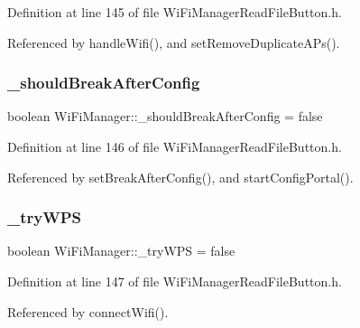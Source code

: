Definition at line 145 of file Wi\+Fi\+Manager\+Read\+File\+Button.\+h.



Referenced by handle\+Wifi(), and set\+Remove\+Duplicate\+A\+Ps().

\mbox{\label{class_wi_fi_manager_adf42bd3bb7ac538e97407f66e5170858}} 
\subsubsection{\texorpdfstring{\+\_\+should\+Break\+After\+Config}{\_shouldBreakAfterConfig}}
{\footnotesize\ttfamily boolean Wi\+Fi\+Manager\+::\+\_\+should\+Break\+After\+Config = false\hspace{0.3cm}{\ttfamily [private]}}



Definition at line 146 of file Wi\+Fi\+Manager\+Read\+File\+Button.\+h.



Referenced by set\+Break\+After\+Config(), and start\+Config\+Portal().

\mbox{\label{class_wi_fi_manager_aad7bf8cc9ff4bf7603f9ce42923c9df1}} 
\subsubsection{\texorpdfstring{\+\_\+try\+W\+PS}{\_tryWPS}}
{\footnotesize\ttfamily boolean Wi\+Fi\+Manager\+::\+\_\+try\+W\+PS = false\hspace{0.3cm}{\ttfamily [private]}}



Definition at line 147 of file Wi\+Fi\+Manager\+Read\+File\+Button.\+h.



Referenced by connect\+Wifi().

\mbox{\label{class_wi_fi_manager_a8860012564a62209d750c50e56319192}} 

